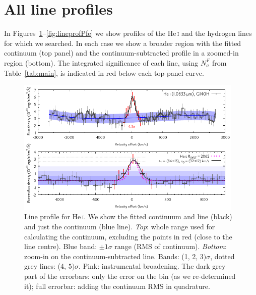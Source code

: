 \documentclass[twocolumn,twocolumnappendix]{aastex631}
\newcommand{\neuI}[1]{{\leavevmode{\boldmath\bfseries#1}}}
\renewcommand{\neuI}[1]{{\leavevmode#1}}
\def\HeI{\ensuremath{\mathrm{He}}\,\textsc{i}\xspace}       %
\def\HeIt{\HeI}                     %
\begin{document}
%

\section{All line profiles}
 \label{sec:alllineprofiles}

In Figures~\ref{fig:lineprofHeIt}--\ref{fig:lineprofPfe} we show profiles of the \HeIt and the hydrogen lines for which we \neuI{searched}. In each case we show a broader region with the fitted continuum (top panel) and the continuum-subtracted profile
%
in a zoomed-in region (bottom).
\neuI{The integrated significance of each line, using $N_\sigma^F$ from Table~\ref{tab:main}, is indicated in red below each top-panel curve.}


\begin{figure}[t]
 \centering
 \includegraphics[width=0.97\textwidth]{TWA27b_g140h-f100lp_blauw_sigkorr_HeIt_Dv2700_ohni300_Abb_simul.pdf}
\caption{%
Line profile for \HeIt. We show the fitted continuum and line (black) and just the continuum (blue line). \textit{Top}: whole range used for calculating the continuum, excluding the points in red (close to the line centre). Blue band: $\pm1\sigma$ range (RMS of continuum). \textit{Bottom}: zoom-in on the continuum-subtracted line. Bands: (1, 2, $3)\sigma$, dotted grey lines: (4, $5)\sigma$.
Pink: instrumental broadening. The dark grey part of the errorbars: only the error on the bin (as we re-determined it); full errorbar: adding the continuum RMS in quadrature.
}
\label{fig:lineprofHeIt}
\end{figure}
\end{document}
